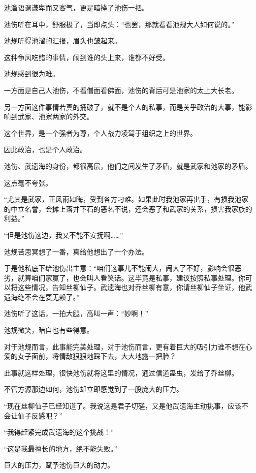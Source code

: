 \begin{this_body}
池溜语调谦卑而又客气，更是暗捧了池伤一把。

池伤听在耳中，舒服极了，当即点头：“也罢，那就看看池规大人如何说的。”

池规听得池溜的汇报，眉头也皱起来。

这种争风吃醋的事情，闹到谁的头上来，谁都不好受。

池规感到很为难。

一方面是自己人池伤，不看僧面看佛面，池伤的背后可是池家的太上大长老。

另一方面这件事情若真的捅破了，就不是个人的私事，而是关乎政治的大事，能影响到武家、池家两家的外交。

这个世界，是一个强者为尊，个人战力凌驾于组织之上的世界。

因此政治，也是个人政治。

池伤、武遗海的身份，都很高层，他们之间发生了矛盾，就是武家和池家的矛盾。

这点毫不夸张。

“尤其是武家，正风雨如晦，受到各方刁难。如果此时我池家再出手，有损我池家的中立名誉，会摊上落井下石的恶名不说，还会恶了和武家的关系，损害我家族的利益。”

“但是池伤这边，我又不能不安抚啊……”

池规苦思冥想了一番，真给他想出了一个办法。

于是他私底下给池伤出主意：“咱们这事儿不能闹大，闹大了不好，影响会很恶劣，就算咱们家赢了，也会叫人看笑话。这毕竟是私事，建议按照私事处理。你可以将这些情况，告知丝柳仙子。武遗海也对乔丝柳有意，你请丝柳仙子坐证，他武遗海绝不会在耍无赖了。”

池伤听了这话，一拍大腿，高叫一声：“妙啊！”

池规微笑，暗自也有些得意。

对于池规而言，此事能完美处理，对于池伤而言，更有着巨大的吸引力谁不想在心爱的女子面前，将情敌狠狠地踩下去，大大地露一把脸？

此事就这样处理，很快池伤就将这里的情况，通过信道蛊虫，发给了乔丝柳。

不管方源那边如何，池伤却立即感觉到了一股庞大的压力。

“现在丝柳仙子已经知道了。我说这是君子切磋，又是他武遗海主动挑事，应该不会让仙子反感吧？”

“我得赶紧完成武遗海的这个挑战！”

“这是我最擅长的地方，绝不能失败。”

巨大的压力，赋予池伤巨大的动力。


\end{this_body}
